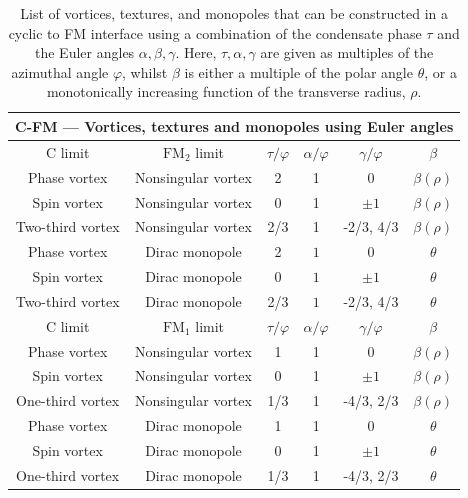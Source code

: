 \begin{table}
    \centering
    \begin{tabular}{cccccc}
        \toprule
        \multicolumn{6}{c}{C-FM --- Vortices, textures and monopoles using Euler
            angles} \\
        \midrule
        C limit & \(\text{FM}_2\) limit &  \(\tau/\varphi\) & \(\alpha/\varphi\)
            & \(\gamma/\varphi\) & \(\beta\) \\
        \midrule
        Phase vortex & Nonsingular vortex & 2 & 1 & 0 & \(\beta(\rho)\) \\ 
        Spin vortex & Nonsingular vortex & 0 & 1 & \(\pm 1\)
            & \(\beta(\rho)\) \\ 
        Two-third vortex & Nonsingular vortex & 2/3 & 1 & -2/3, 4/3
            & \(\beta(\rho)\) \\
        Phase vortex & Dirac monopole & 2 & \(1\) & 0 & \(\theta\) \\ 
        Spin vortex & Dirac monopole & 0 & \( 1\) & \(\pm 1\)
            & \(\theta\) \\ 
        Two-third vortex & Dirac monopole & 2/3 & \( 1\) & -2/3, 4/3
            & \(\theta\) \\
        \bottomrule
        \midrule
        C limit & \(\text{FM}_1\) limit &  \(\tau/\varphi\) & \(\alpha/\varphi\)
            & \(\gamma/\varphi\) & \(\beta\) \\
        \midrule
        Phase vortex & Nonsingular vortex & 1 & 1 & 0 & \(\beta(\rho)\) \\ 
        Spin vortex & Nonsingular vortex & 0 & 1 & \(\pm 1\)
            & \(\beta(\rho)\) \\ 
        One-third vortex & Nonsingular vortex & 1/3 & 1 & -4/3, 2/3
            & \(\beta(\rho)\) \\
        Phase vortex & Dirac monopole & 1 & 1 & 0 & \(\theta\) \\ 
        Spin vortex & Dirac monopole & 0 & 1 & \(\pm 1\) & \(\theta\)\\ 
        One-third vortex & Dirac monopole & 1/3 & 1 & -4/3, 2/3 & \(\theta\) \\
        \bottomrule
    \end{tabular}
    \caption[Examples of monopoles and nonsingular vortex connections across a
    cyclic to ferromagnetic interface.]
    {\label{tab: C-FM-other}List of vortices, textures, and monopoles
    that can be constructed in a cyclic to FM interface using a combination
    of the condensate phase \(\tau\) and the Euler angles \(\alpha, \beta,
    \gamma\).
    Here, \(\tau, \alpha, \gamma\) are given as multiples of the azimuthal angle
    \(\varphi\), whilst \(\beta\) is either a multiple of the polar angle
    \(\theta\), or a monotonically increasing function of the transverse radius,
    \(\rho\).}
\end{table}

